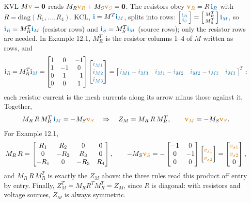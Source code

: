 \documentclass[11pt,a4paper]{article}
\newcommand{\Icol}[1]{\textcolor{ccur}{#1}}
\newcommand{\Vcol}[1]{\textcolor{cvolt}{#1}}
\newcommand{\im}[1]{\textcolor{ccur}{i_{M#1}}}
\begin{document}
KVL $M\Vcol{\mathbf{v}} = \mathbf{0}$ reads $M_R\Vcol{\mathbf{v}_R} + M_S\Vcol{\mathbf{v}_S} = \mathbf{0}$.
The resistors obey $\Vcol{\mathbf{v}_R} = R\,\Icol{\mathbf{i}_R}$ with
$R = \mathrm{diag}(R_1, \dots, R_4)$. KCL, $\Icol{\mathbf{i}} = M^T\Icol{\mathbf{i}_M}$, splits into
rows: $\left[\begin{smallmatrix} \Icol{\mathbf{i}_R}\\ \Icol{\mathbf{i}_S} \end{smallmatrix}\right]
= \left[\begin{smallmatrix} M_R^T\\ M_S^T \end{smallmatrix}\right]\Icol{\mathbf{i}_M}$, so
$\Icol{\mathbf{i}_R} = M_R^T\Icol{\mathbf{i}_M}$ (resistor rows) and
$\Icol{\mathbf{i}_S} = M_S^T\Icol{\mathbf{i}_M}$ (source rows); only the resistor rows are
needed. In Example 12.1, $M_R^T$ is the resistor columns 1--4 of $M$ written
as rows, and
\[
  \Icol{\mathbf{i}_R} = M_R^T\Icol{\mathbf{i}_M} =
  \begin{bmatrix} 1 & 0 & -1\\ 1 & -1 & 0\\ 0 & 1 & -1\\ 0 & 0 & 1 \end{bmatrix}
  \begin{bmatrix} \im{1}\\ \im{2}\\ \im{3} \end{bmatrix}
  = \big[\, \im{1} - \im{3} \quad \im{1} - \im{2} \quad \im{2} - \im{3} \quad \im{3} \,\big]^T :
\]
each resistor current is the mesh currents along its arrow minus those against it. Together,
\[
  M_R\, R\, M_R^T\,\Icol{\mathbf{i}_M} = -M_S\Vcol{\mathbf{v}_S}
  \quad\Rightarrow\quad
  Z_M = M_R\, R\, M_R^T, \qquad \Vcol{\mathbf{v}_M} = -M_S\Vcol{\mathbf{v}_S}.
\]
For Example 12.1,
\[
  M_R\, R = \begin{bmatrix}
    R_1 & R_2 & 0 & 0\\ 0 & -R_2 & R_3 & 0\\ -R_1 & 0 & -R_3 & R_4
  \end{bmatrix}, \qquad
  -M_S\Vcol{\mathbf{v}_S} = -\begin{bmatrix} -1 & 0\\ 0 & -1\\ 0 & 0 \end{bmatrix}
  \begin{bmatrix} \Vcol{v_{s1}}\\ \Vcol{v_{s2}} \end{bmatrix}
  = \begin{bmatrix} \Vcol{v_{s1}}\\ \Vcol{v_{s2}}\\ 0 \end{bmatrix},
\]
and $M_R\, R\, M_R^T$ is exactly the $Z_M$ above: the three rules read this product off entry by
entry. Finally, $Z_M^T = M_R R^T M_R^T = Z_M$, since $R$ is diagonal: with resistors and voltage
sources, $Z_M$ is always symmetric.
\end{document}
